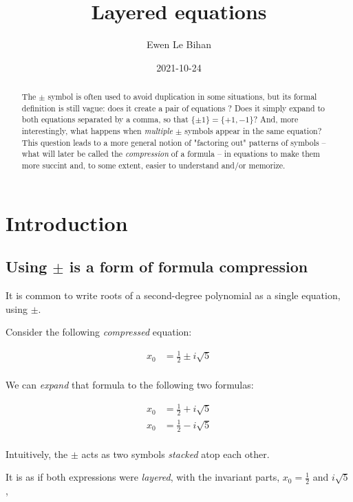 \documentclass{article}
\title{Layered equations}
\author{Ewen Le Bihan}
\date{2021-10-24}
\theoremstyle{definition}
\begin{document}
\maketitle

\begin{abstract}
	The $\pm$ symbol is often used to avoid duplication in some situations, 
	but its formal definition is still vague: does it create a pair of equations ?
	Does it simply expand to both equations separated by a comma, so that $\{\pm 1	\} = \{+1, -1\}  $?
	And, more interestingly, what happens when \emph{multiple} $\pm$ symbols appear in the same equation?
	This question leads to a more general notion of "factoring out" patterns 
	of symbols -- what will later be called the \emph{compression} of a formula -- 
	in equations to make them more succint and, to some extent, 
	easier to understand and/or memorize.
\end{abstract}

\tableofcontents

\section{Introduction}
\subsection{Using $\pm$ is a form of formula compression}
\label{plus-minus-is-formula-compression}

It is common to write roots of a second-degree polynomial as a single equation, using $\pm$.

Consider the following \emph{compressed} equation:

\begin{align*}
	x_0 &= \frac{1}{2} \pm i\sqrt{5}  \\
\end{align*}

We can \emph{expand} that formula to the following two formulas:

\begin{align*}
	x_0 &= \frac{1}{2} + i\sqrt{5} \tag{top layer} \\
	x_0 &= \frac{1}{2} - i\sqrt{5} \tag{bottom layer} \\
\end{align*}

Intuitively, the $\pm$ acts as two symbols \emph{stacked} atop each other.

It is as if both expressions were \emph{layered}, with the invariant parts, $x_0 = \frac{1}{2}$ and $i\sqrt{5} $,
\end{document}
